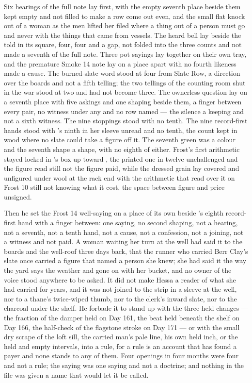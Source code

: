 Six hearings of the full note lay first, with the empty seventh place beside them kept empty and not filled to make a row come out even, and the small flat knock out of a woman as the men lifted her filed where a thing out of a person must go and never with the things that came from vessels. The heard bell lay beside the told in its square, four, four and a gap, not folded into the three counts and not made a seventh of the full note. Three pot sayings lay together on their own tray, and the premature Smoke 14 note lay on a place apart with no fourth likeness made a cause. The burned-slate word stood at four from Slate Row, a direction over the boards and not a fifth telling; the two tellings of the counting room shut in the war stood at two and had not become three. The ownerless question lay on a seventh place with five askings and one shaping beside them, a finger between every pair, no witness under any and no row named --- the silence a keeping and not a sixth witness. The nine stoppings stood with no tenth. The nine record-first hands stood with 's ninth in her sleeve unread and no tenth, the count kept in wood where no slate could take a figure off it. The seventh green was a colour and the seventh shape a shape, with no eighth of either. Frost's first arithmetic stayed locked in 's box up  toward , the printed one in twelve unchallenged and the figure read still not the figure paid, while the dressed grain lay covered and unfigured under wool at the rack end with the arithmetic that read over it on Frost 10 still not knowing what it cost, the space between figure and price unsigned.

Then he set the Frost 14 well-saying on a place of its own beside 's eighth record-first hand with a finger between: one saying, no second shaping, not a hearing, not a seventh, not a tenth hand, not a cause, not a confession, not a joining, not a witness and not paid. A woman waiting her turn at the well had said it to the boards and the well-roof three days back, that the runner who carried Berr Clay's slate once carried a figure that named a person she knew; she had said it the way the yard says the weather and gone on with her bucket, and no owner of the voice stood anywhere to be asked. It did not make Hessa a reader of what she had carried for years, and it was not joined to the strip in a sleeve at the well, nor to a thane's twice-wiped thumb, nor to the clerk's inward slate, nor to the charcoal under the shelf. He forbade it to stand up with the three held changes --- the fraction of the damper held on Day 161, the beat held beneath the shelf on Day 166, the half-check of the flagstone stroke on Day 171 --- or with the small dry scrape of the loft sill, the carried man's pale line, his own held inch, or the held and empty intervals, into a rule, for a rule is an account that has found a payer and none stands to any of them. Four openings in four months were four and not a rule; the saying was one saying and not a doctrine; and nothing in the file was given a name that would let it be called.

